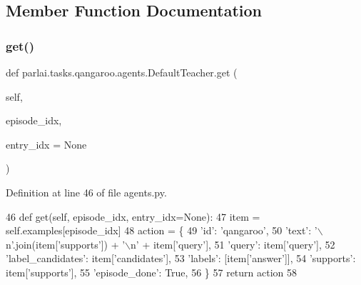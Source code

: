 \subsection{Member Function Documentation}
\mbox{\label{classparlai_1_1tasks_1_1qangaroo_1_1agents_1_1DefaultTeacher_a02b79b33e67868bc575b65e26de38d51}} 
\subsubsection{\texorpdfstring{get()}{get()}}
{\footnotesize\ttfamily def parlai.\+tasks.\+qangaroo.\+agents.\+Default\+Teacher.\+get (\begin{DoxyParamCaption}\item[{}]{self,  }\item[{}]{episode\+\_\+idx,  }\item[{}]{entry\+\_\+idx = {\ttfamily None} }\end{DoxyParamCaption})}



Definition at line 46 of file agents.\+py.


\begin{DoxyCode}
46     \textcolor{keyword}{def }get(self, episode\_idx, entry\_idx=None):
47         item = self.examples[episode\_idx]
48         action = \{
49             \textcolor{stringliteral}{'id'}: \textcolor{stringliteral}{'qangaroo'},
50             \textcolor{stringliteral}{'text'}: \textcolor{stringliteral}{'\(\backslash\)n'}.join(item[\textcolor{stringliteral}{'supports'}]) + \textcolor{stringliteral}{'\(\backslash\)n'} + item[\textcolor{stringliteral}{'query'}],
51             \textcolor{stringliteral}{'query'}: item[\textcolor{stringliteral}{'query'}],
52             \textcolor{stringliteral}{'label\_candidates'}: item[\textcolor{stringliteral}{'candidates'}],
53             \textcolor{stringliteral}{'labels'}: [item[\textcolor{stringliteral}{'answer'}]],
54             \textcolor{stringliteral}{'supports'}: item[\textcolor{stringliteral}{'supports'}],
55             \textcolor{stringliteral}{'episode\_done'}: \textcolor{keyword}{True},
56         \}
57         \textcolor{keywordflow}{return} action
58 
\end{DoxyCode}
\mbox{\label{classparlai_1_1tasks_1_1qangaroo_1_1agents_1_1DefaultTeacher_a467ada61caf807815a88abfd6e742799}} 
